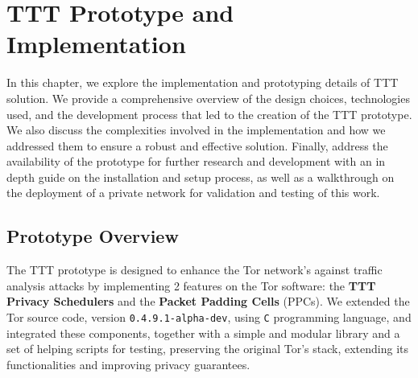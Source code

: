 
%

\chapter{TTT Prototype and Implementation}\label{cha:implementation}

In this chapter, we explore the implementation and prototyping details of TTT solution. We provide a comprehensive overview of the design choices, technologies used, and the development process that led to the creation of the TTT prototype. We also discuss the complexities involved in the implementation and how we addressed them to ensure a robust and effective solution. 
Finally, address the availability of the prototype for further research and development with an in depth guide on the installation and setup process, as well as a walkthrough on the deployment of a private network for validation and testing of this work. 

\section{Prototype Overview}\label{sec:prototype_overview}

The TTT prototype is designed to enhance the Tor network's against traffic analysis attacks by implementing 2 features on the Tor software: the \textbf{TTT Privacy Schedulers} and the \textbf{Packet Padding Cells} (PPCs). We extended the Tor source code, version \texttt{0.4.9.1-alpha-dev}, using \texttt{C} programming language, and integrated these components, together with a simple and modular library and a set of helping scripts for testing, preserving the original Tor's stack, extending its functionalities and improving privacy guarantees.

